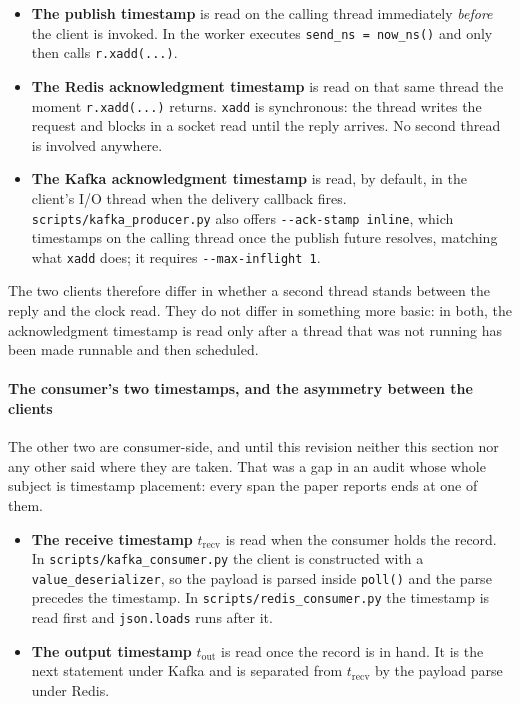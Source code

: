 \documentclass[10pt,journal,onecolumn]{IEEEtran}
\newcommand{\kafka}{Kafka}
\newcommand{\redis}{Redis}
\begin{document}
\begin{itemize}
\item \textbf{The publish timestamp} is read on the calling thread immediately \emph{before} the
client is invoked. In  the worker executes
\texttt{send\_ns = now\_ns()} and only then calls \texttt{r.xadd(...)}.
\item \textbf{The \redis{} acknowledgment timestamp} is read on that same thread the moment
\texttt{r.xadd(...)} returns. \texttt{xadd} is synchronous: the thread writes the request and
blocks in a socket read until the reply arrives. No second thread is involved anywhere.
\item \textbf{The \kafka{} acknowledgment timestamp} is read, by default, in the client's I/O
thread when the delivery callback fires. \texttt{scripts/kafka\_producer.py} also offers
\texttt{-{}-ack-stamp inline}, which timestamps on the calling thread once the publish future
resolves, matching what \texttt{xadd} does; it requires \texttt{-{}-max-inflight~1}.
\end{itemize}

The two clients therefore differ in whether a second thread stands between the reply and the
clock read. They do not differ in something more basic: in both, the acknowledgment timestamp is
read only after a thread that was not running has been made runnable and then scheduled.

\paragraph{The consumer's two timestamps, and the asymmetry between the clients}
The other two are consumer-side, and until this revision neither this section nor any other
said where they are taken. That was a gap in an audit whose whole subject is timestamp
placement: every span the paper reports ends at one of them.

\begin{itemize}
\item \textbf{The receive timestamp} $t_{\mathrm{recv}}$ is read when the consumer holds the
record. In \texttt{scripts/kafka\_consumer.py} the client is constructed with a
\texttt{value\_deserializer}, so the payload is parsed inside \texttt{poll()} and the parse
precedes the timestamp. In \texttt{scripts/redis\_consumer.py} the timestamp is read first and
\texttt{json.loads} runs after it.
\item \textbf{The output timestamp} $t_{\mathrm{out}}$ is read once the record is in hand. It is
the next statement under \kafka{} and is separated from $t_{\mathrm{recv}}$ by the payload
parse under \redis{}.
\end{itemize}
\end{document}
